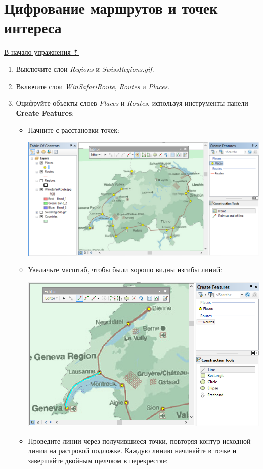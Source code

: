 \documentclass[]{book}
\theoremstyle{definition}
\theoremstyle{definition}
\theoremstyle{definition}
\theoremstyle{remark}
\begin{document}
\hypertarget{map-ref-general-routes-poi}{%
\section{Цифрование маршрутов и точек
интереса}\label{map-ref-general-routes-poi}}

\protect\hyperlink{map-ref-general}{В начало упражнения ⇡}

\begin{enumerate}
\def\labelenumi{\arabic{enumi}.}
\item
  Выключите слои \emph{Regions} и \emph{SwissRegions.gif}.
\item
  Включите слои \emph{WinSafariRoute}, \emph{Routes} и \emph{Places}.
\item
  Оцифруйте объекты слоев \emph{Places} и \emph{Routes}, используя
  инструменты панели \textbf{Сreate Features}:

  \begin{itemize}
  \item
    Начните с расстановки точек:

    \includegraphics{images/Ex07/image25.png}
  \item
    Увеличьте масштаб, чтобы были хорошо видны изгибы линий:

    \includegraphics{images/Ex07/image26.png}
  \item
    Проведите линии через получившиеся точки, повторяя контур исходной
    линии на растровой подложке. Каждую линию начинайте в точке и
    завершайте двойным щелчком в перекрестке:


\end{itemize}
\end{enumerate}
\end{document}
